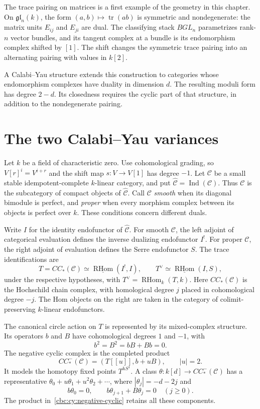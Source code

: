 The trace pairing on matrices is a first example of the geometry in this chapter.
On $\mathfrak{gl}_n(k)$, the form $(a,b)\mapsto\operatorname{tr}(ab)$ is symmetric and nondegenerate: the matrix units $E_{ij}$ and $E_{ji}$ are dual.
The classifying stack $BGL_n$ parametrizes rank-$n$ vector bundles, and its tangent complex at a bundle is its endomorphism complex shifted by $[1]$.
The shift changes the symmetric trace pairing into an alternating pairing with values in $k[2]$.

A Calabi--Yau structure extends this construction to categories whose endomorphism complexes have duality in dimension $d$.
The resulting moduli form has degree $2-d$.
Its closedness requires the cyclic part of that structure, in addition to the nondegenerate pairing.

\section{The two Calabi--Yau variances}

Let $k$ be a field of characteristic zero.
Use cohomological grading, so $V[r]^i=V^{i+r}$ and the shift map $s:V\to V[1]$ has degree $-1$.
Let $\mathcal C$ be a small stable idempotent-complete $k$-linear category, and put $\widehat{\mathcal C}=\operatorname{Ind}(\mathcal C)$.
Thus $\mathcal C$ is the subcategory of compact objects of $\widehat{\mathcal C}$.
Call $\mathcal C$ \emph{smooth} when its diagonal bimodule is perfect, and \emph{proper} when every morphism complex between its objects is perfect over $k$.
These conditions concern different duals.

Write $I$ for the identity endofunctor of $\widehat{\mathcal C}$.
For smooth $\mathcal C$, the left adjoint of categorical evaluation defines the inverse dualizing endofunctor $I^!$.
For proper $\mathcal C$, the right adjoint of evaluation defines the Serre endofunctor $S$.
The trace identifications are
\[
 T=CC_*(\mathcal C)\simeq
 \underline{\operatorname{RHom}}(I^!,I),\qquad
 T^\vee\simeq\underline{\operatorname{RHom}}(I,S),
\]
under the respective hypotheses, with $T^\vee=\operatorname{RHom}_k(T,k)$.
Here $CC_*(\mathcal C)$ is the Hochschild chain complex, with homological degree $j$ placed in cohomological degree $-j$.
The Hom objects on the right are taken in the category of colimit-preserving $k$-linear endofunctors.

The canonical circle action on $T$ is represented by its mixed-complex structure.
Its operators $b$ and $B$ have cohomological degrees $1$ and $-1$, with
\[
 b^2=B^2=bB+Bb=0.
\]
The negative cyclic complex is the completed product
\begin{equation}\label{cbc:cy:negative-cyclic}
 CC^-_*(\mathcal C)=(T[[u]],b+uB),\qquad |u|=2.
\end{equation}
It models the homotopy fixed points $T^{hS^1}$.
A class $\theta:k[d]\to CC^-_*(\mathcal C)$ has a representative
$\theta_0+u\theta_1+u^2\theta_2+\cdots$, where $|\theta_j|=-d-2j$ and
\begin{equation}\label{cbc:cy:lift-equations}
 b\theta_0=0,\qquad b\theta_{j+1}+B\theta_j=0\quad(j\geq0).
\end{equation}
The product in~\eqref{cbc:cy:negative-cyclic} retains all these components.

